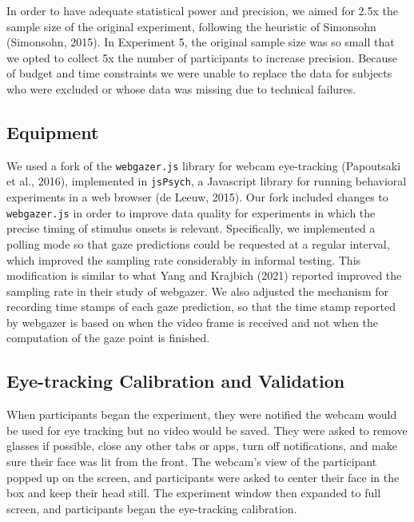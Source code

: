 \documentclass[
  man,floatsintext]{apa6}
\begin{document}
In order to have adequate statistical power and precision, we aimed for
2.5x the sample size of the original experiment, following the heuristic
of Simonsohn (Simonsohn, 2015). In Experiment 5, the original sample size was so
small that we opted to collect 5x the number of participants to increase
precision. Because of budget and time constraints we were unable to
replace the data for subjects who were excluded or whose data was
missing due to technical failures.

\subsection{Equipment}\label{equipment}

We used a fork of the \texttt{webgazer.js} library for webcam eye-tracking
(Papoutsaki et al., 2016), implemented in \texttt{jsPsych}, a Javascript
library for running behavioral experiments in a web browser
(de Leeuw, 2015). Our fork included changes to
\texttt{webgazer.js} in order to improve data quality for experiments in which
the precise timing of stimulus onsets is relevant. Specifically, we
implemented a polling mode so that gaze predictions could be requested
at a regular interval, which improved the sampling rate considerably in
informal testing. This modification is similar to what Yang and Krajbich
(2021) reported improved the sampling rate in their study of
webgazer. We also adjusted the mechanism for recording time stamps of
each gaze prediction, so that the time stamp reported by webgazer is
based on when the video frame is received and not when the computation
of the gaze point is finished.

\subsection{Eye-tracking Calibration and Validation}\label{eye-tracking-calibration-and-validation}

When participants began the experiment, they were notified the webcam
would be used for eye tracking but no video would be saved. They were
asked to remove glasses if possible, close any other tabs or apps, turn
off notifications, and make sure their face was lit from the front. The
webcam's view of the participant popped up on the screen, and
participants were asked to center their face in the box and keep their
head still. The experiment window then expanded to full screen, and
participants began the eye-tracking calibration.
\end{document}

